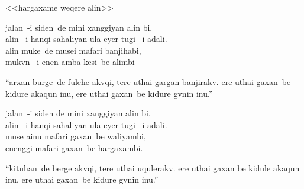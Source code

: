 

{\mj \LARGE

\begin{center}
    <<hargaxame weqere alin>>
\end{center}

\noindent jalan~-i siden~de mini xanggiyan alin bi,\\
alin~-i hanqi sahaliyan ula eyer tugi~-i adali.\\
alin muke~de musei mafari banjihabi,\\
mukvn~-i enen amba kesi~be alimbi

``arxan burge~de fulehe akvqi, tere uthai gargan banjirakv. ere uthai gaxan~be kidure akaqun inu, ere uthai gaxan~be kidure gvnin inu.''

\noindent jalan~-i siden de mini xanggiyan alin bi,\\
alin~-i hanqi sahaliyan ula eyer tugi~-i adali.\\
muse ainu mafari gaxan~be waliyambi,\\
enenggi mafari gaxan~be hargaxambi.

``kituhan~de berge akvqi, tere uthai uqulerakv. ere uthai gaxan be kidule akaqun inu, ere uthai gaxan~be kidure gvnin inu.''






}

